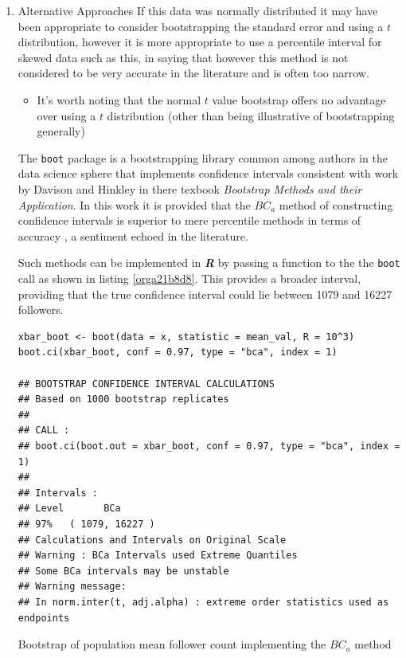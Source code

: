 \documentclass[11pt]{article}
\begin{document}
\begin{enumerate}
\item Alternative Approaches
\label{sec:orga4c188d}
If this data was normally distributed it may have been appropriate to consider
bootstrapping the standard error and using a \(t\) distribution, however it is more appropriate to use a
percentile interval for skewed data such as this, in saying that however this method is not considered to be very accurate in the literature and is often too narrow. \cite[Section 4.1]{hesterberg2015}

\begin{itemize}
\item It's worth noting that the normal \(t\) value bootstrap offers no advantage over
using a \(t\) distribution (other than being illustrative of bootstrapping
generally) \cite[Section 4.1]{hesterberg2015}
\end{itemize}


 The \texttt{boot} package is a bootstrapping library common among authors in the data science sphere
 \cite[p. 295]{james2013} \cite[p. 237]{wiley2019} that implements
 confidence intervals consistent with work by Davison and Hinkley
 \cite{ripley2020} in there texbook \emph{Bootstrap Methods and their Application}.
In this work it is provided that the \(BC_{a}\) method of constructing confidence
 intervals is  superior to mere percentile
 methods in terms of accuracy \cite[Ch. 5]{davison1997}, a sentiment echoed in the literature. \cite[Ch. 5]{carpenter2000,davison1997}

Such methods can be implemented in \textbf{\emph{R}} by passing a function to the the \texttt{boot} call as shown in listing \ref{orga21b8d8}. This provides a broader interval, providing that the true confidence interval could lie between 1079 and 16227 followers.

\begin{listing}[htbp]
\begin{verbatim}
xbar_boot <- boot(data = x, statistic = mean_val, R = 10^3)
boot.ci(xbar_boot, conf = 0.97, type = "bca", index = 1)

## BOOTSTRAP CONFIDENCE INTERVAL CALCULATIONS
## Based on 1000 bootstrap replicates
##
## CALL :
## boot.ci(boot.out = xbar_boot, conf = 0.97, type = "bca", index = 1)
##
## Intervals :
## Level       BCa
## 97%   ( 1079, 16227 )
## Calculations and Intervals on Original Scale
## Warning : BCa Intervals used Extreme Quantiles
## Some BCa intervals may be unstable
## Warning message:
## In norm.inter(t, adj.alpha) : extreme order statistics used as endpoints
\end{verbatim}
\caption{\label{orga21b8d8}Bootstrap of population mean follower count implementing the \(BC_{a}\) method}
\end{listing}
\end{enumerate}
\end{document}
